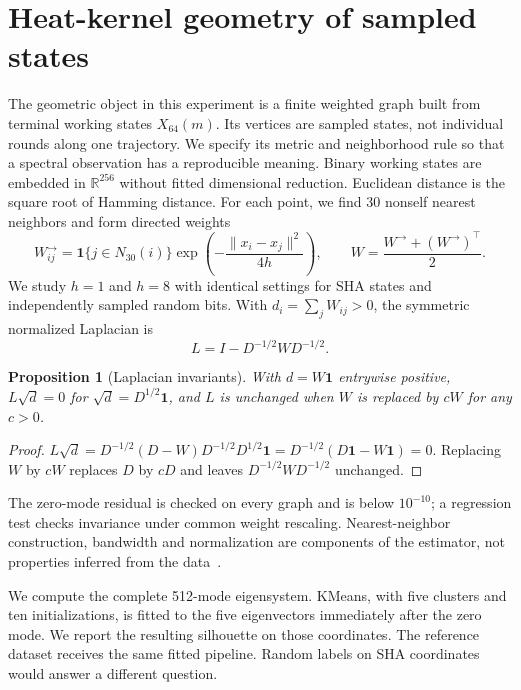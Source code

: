 \documentclass[11pt]{article}
\newtheorem{proposition}{Proposition}
\begin{document}
\section{Heat-kernel geometry of sampled states}
The geometric object in this experiment is a finite weighted graph built from terminal working states $X_{64}(m)$. Its vertices are sampled states, not individual rounds along one trajectory. We specify its metric and neighborhood rule so that a spectral observation has a reproducible meaning.
Binary working states are embedded in $\mathbb R^{256}$ without fitted dimensional reduction. Euclidean distance is the square root of Hamming distance. For each point, we find 30 nonself nearest neighbors and form directed weights
\begin{equation}
 W^{\rightarrow}_{ij}=\mathbf 1\{j\in N_{30}(i)\}
 \exp\!\left(-\frac{\|x_i-x_j\|^2}{4h}\right),\qquad
 W=\frac{W^{\rightarrow}+(W^{\rightarrow})^\top}{2}.
\end{equation}
We study $h=1$ and $h=8$ with identical settings for SHA states and independently sampled random bits. With $d_i=\sum_jW_{ij}>0$, the symmetric normalized Laplacian is
\begin{equation}L=I-D^{-1/2}WD^{-1/2}.\end{equation}
\begin{proposition}[Laplacian invariants]\label{prop:invariants}
With $d=W\mathbf 1$ entrywise positive, $L\sqrt d=0$ for $\sqrt d=D^{1/2}\mathbf 1$, and $L$ is unchanged when $W$ is replaced by $cW$ for any $c>0$.
\end{proposition}
\begin{proof}
$L\sqrt d=D^{-1/2}(D-W)D^{-1/2}D^{1/2}\mathbf 1=D^{-1/2}(D\mathbf 1-W\mathbf 1)=0$. Replacing $W$ by $cW$ replaces $D$ by $cD$ and leaves $D^{-1/2}WD^{-1/2}$ unchanged.
\end{proof}
The zero-mode residual is checked on every graph and is below $10^{-10}$; a regression test checks invariance under common weight rescaling. Nearest-neighbor construction, bandwidth and normalization are components of the estimator, not properties inferred from the data~\cite{luxburg}.

We compute the complete 512-mode eigensystem. KMeans, with five clusters and ten initializations, is fitted to the five eigenvectors immediately after the zero mode. We report the resulting silhouette on those coordinates. The reference dataset receives the same fitted pipeline. Random labels on SHA coordinates would answer a different question.
\end{document}
